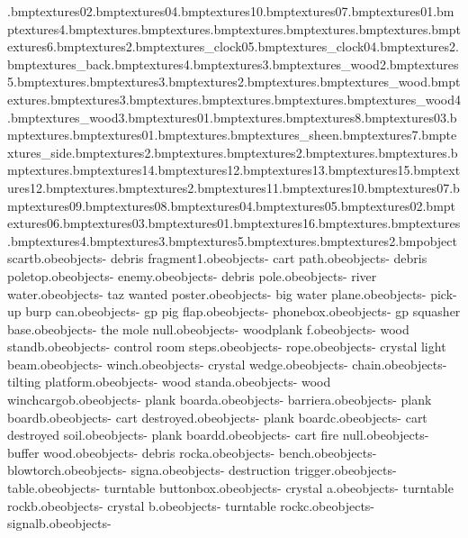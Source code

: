 .bmp textures\minerock02.bmp textures\minerock04.bmp textures\minerock10.bmp textures\minerock07.bmp textures\minerock01.bmp textures\minejoiner4.bmp textures\westhub.bmp textures\turntabledge.bmp textures\track.bmp textures\mineposts.bmp textures\minehut.bmp textures\minehut6.bmp textures\supportwood2.bmp textures\station_clock05.bmp textures\station_clock04.bmp textures\minehut2.bmp textures\hut_back.bmp textures\minehut4.bmp textures\minehut3.bmp textures\mine_wood2.bmp textures\minehut5.bmp textures\minemodtrack.bmp textures\minemodtrack3.bmp textures\minemodtrack2.bmp textures\sleeper.bmp textures\track_wood.bmp textures\sand.bmp textures\supportwood3.bmp textures\gurdera.bmp textures\supportwood.bmp textures\minewater.bmp textures\mine_wood4.bmp textures\mine_wood3.bmp textures\wwrock01.bmp textures\wrongwaysign.bmp textures\minehut8.bmp textures\samcan03.bmp textures\canlids.bmp textures\trashcanlid01.bmp textures\antanae.bmp textures\green_sheen.bmp textures\minehut7.bmp textures\hut_side.bmp textures\frontdoor2.bmp textures\barrierstart.bmp textures\mcontrolpanel2.bmp textures\tazrockwanted.bmp textures\mcontrolpanel.bmp textures\gmbridgewood.bmp textures\minefloor14.bmp textures\minefloor12.bmp textures\minefloor13.bmp textures\minefloor15.bmp textures\minerockblue12.bmp textures\minesafefloor.bmp textures\minesafefloor2.bmp textures\minerockblue11.bmp textures\minerockblue10.bmp textures\minerockblue07.bmp textures\minerockblue09.bmp textures\minerockblue08.bmp textures\minerockblue04.bmp textures\minerockblue05.bmp textures\minerockblue02.bmp textures\minerockblue06.bmp textures\minerockblue03.bmp textures\minerockblue01.bmp textures\minefloor16.bmp textures\mineentrance.bmp textures\minesafefront.bmp textures\minesafe4.bmp textures\minesafe3.bmp textures\minesafe5.bmp textures\minesafe.bmp textures\gmbridgewood2.bmp objects\trigger cartb.obe objects\bank - debris fragment1.obe objects\bank - cart path.obe objects\bank - debris poletop.obe objects\bank - enemy.obe objects\bank - debris pole.obe objects\bank - river water.obe objects\bank - taz wanted poster.obe objects\bank - big water plane.obe objects\bank - pick-up burp can.obe objects\bank - gp pig flap.obe objects\bank - phonebox.obe objects\bank - gp squasher base.obe objects\bank - the mole null.obe objects\bank - woodplank f.obe objects\bank - wood standb.obe objects\bank - control room steps.obe objects\bank - rope.obe objects\bank - crystal light beam.obe objects\bank - winch.obe objects\bank - crystal wedge.obe objects\bank - chain.obe objects\bank - tilting platform.obe objects\bank - wood standa.obe objects\bank - wood winchcargob.obe objects\bank - plank boarda.obe objects\bank - barriera.obe objects\bank - plank boardb.obe objects\bank - cart destroyed.obe objects\bank - plank boardc.obe objects\bank - cart destroyed soil.obe objects\bank - plank boardd.obe objects\bank - cart fire null.obe objects\bank - buffer wood.obe objects\bank - debris rocka.obe objects\bank - bench.obe objects\bank - blowtorch.obe objects\bank - signa.obe objects\bank - destruction trigger.obe objects\bank - table.obe objects\bank - turntable buttonbox.obe objects\bank - crystal a.obe objects\bank - turntable rockb.obe objects\bank - crystal b.obe objects\bank - turntable rockc.obe objects\bank - signalb.obe objects\bank - 